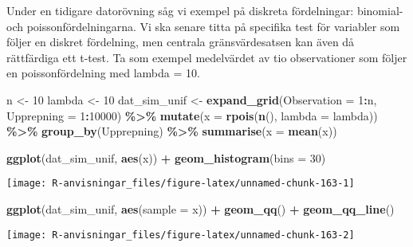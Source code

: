 \documentclass[
]{book}
\newenvironment{Shaded}{\begin{snugshade}}{\end{snugshade}}
\newcommand{\AttributeTok}[1]{\textcolor[rgb]{0.13,0.29,0.53}{#1}}
\newcommand{\DecValTok}[1]{\textcolor[rgb]{0.00,0.00,0.81}{#1}}
\newcommand{\FunctionTok}[1]{\textcolor[rgb]{0.13,0.29,0.53}{\textbf{#1}}}
\newcommand{\NormalTok}[1]{#1}
\newcommand{\OtherTok}[1]{\textcolor[rgb]{0.56,0.35,0.01}{#1}}
\newcommand{\SpecialCharTok}[1]{\textcolor[rgb]{0.81,0.36,0.00}{\textbf{#1}}}
\theoremstyle{definition}
\theoremstyle{definition}
\theoremstyle{definition}
\theoremstyle{definition}
\theoremstyle{remark}
\begin{document}
Under en tidigare datorövning såg vi exempel på diskreta fördelningar: binomial- och poissonfördelningarna. Vi ska senare titta på specifika test för variabler som följer en diskret fördelning, men centrala gränsvärdesatsen kan även då rättfärdiga ett t-test. Ta som exempel medelvärdet av tio observationer som följer en poissonfördelning med lambda = 10.

\begin{Shaded}
\begin{Highlighting}[]
\NormalTok{n }\OtherTok{\textless{}{-}} \DecValTok{10}
\NormalTok{lambda }\OtherTok{\textless{}{-}} \DecValTok{10}
\NormalTok{dat\_sim\_unif }\OtherTok{\textless{}{-}} \FunctionTok{expand\_grid}\NormalTok{(}\AttributeTok{Observation =} \DecValTok{1}\SpecialCharTok{:}\NormalTok{n, }\AttributeTok{Upprepning =} \DecValTok{1}\SpecialCharTok{:}\DecValTok{10000}\NormalTok{) }\SpecialCharTok{\%\textgreater{}\%} 
  \FunctionTok{mutate}\NormalTok{(}\AttributeTok{x =} \FunctionTok{rpois}\NormalTok{(}\FunctionTok{n}\NormalTok{(), }\AttributeTok{lambda =}\NormalTok{ lambda)) }\SpecialCharTok{\%\textgreater{}\%} 
  \FunctionTok{group\_by}\NormalTok{(Upprepning) }\SpecialCharTok{\%\textgreater{}\%} 
  \FunctionTok{summarise}\NormalTok{(}\AttributeTok{x =} \FunctionTok{mean}\NormalTok{(x))}

\FunctionTok{ggplot}\NormalTok{(dat\_sim\_unif, }\FunctionTok{aes}\NormalTok{(x)) }\SpecialCharTok{+} \FunctionTok{geom\_histogram}\NormalTok{(}\AttributeTok{bins =} \DecValTok{30}\NormalTok{)}
\end{Highlighting}
\end{Shaded}

\begin{center}\texttt{[image: R-anvisningar\_files/figure-latex/unnamed-chunk-163-1]} \end{center}

\begin{Shaded}
\begin{Highlighting}[]
\FunctionTok{ggplot}\NormalTok{(dat\_sim\_unif, }\FunctionTok{aes}\NormalTok{(}\AttributeTok{sample =}\NormalTok{ x)) }\SpecialCharTok{+} \FunctionTok{geom\_qq}\NormalTok{() }\SpecialCharTok{+} \FunctionTok{geom\_qq\_line}\NormalTok{()}
\end{Highlighting}
\end{Shaded}

\begin{center}\texttt{[image: R-anvisningar\_files/figure-latex/unnamed-chunk-163-2]} \end{center}
\end{document}
